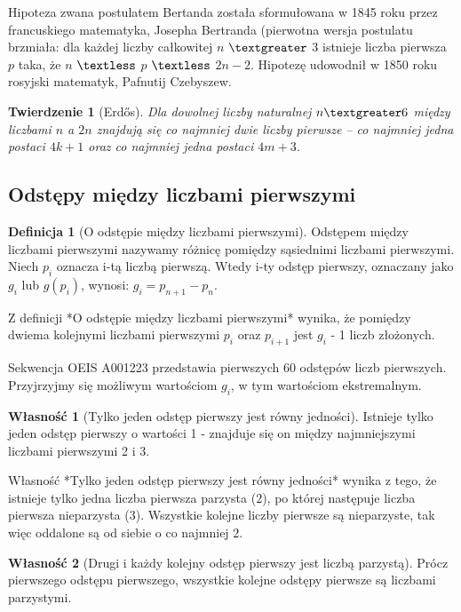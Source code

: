 \documentclass[10pt,onecolumn]{article}
\newtheorem{theorem}{Twierdzenie}
\theoremstyle{definition}
\newtheorem{definition}{Definicja}
\theoremstyle{hypothesis}
\theoremstyle{capability}
\newtheorem{capability}{Własność}
\begin{document}
Hipoteza zwana postulatem Bertanda została sformułowana w 1845 roku przez francuskiego matematyka, Josepha Bertranda (pierwotna wersja postulatu brzmiała:  dla każdej liczby całkowitej $n$ $\textgreater$ $3$ istnieje liczba pierwsza $p$ taka, że $n$ $\textless$ $p$ $\textless$ $2n-2$. Hipotezę udowodnił w 1850 roku rosyjski matematyk, Pafnutij Czebyszew.

\begin{theorem}[Erdős]
Dla dowolnej liczby naturalnej $n \textgreater 6$  między liczbami $n$ a $2n$ znajdują się co najmniej dwie liczby pierwsze – co najmniej jedna postaci $4k+1$ oraz co najmniej jedna postaci $4m+3$. 
\end{theorem}

\subsection{Odstępy między liczbami pierwszymi}

\begin{definition} [O odstępie między liczbami pierwszymi]
Odstępem między liczbami pierwszymi nazywamy różnicę pomiędzy sąsiednimi liczbami pierwszymi. Niech $p_i$ oznacza i-tą liczbą pierwszą. Wtedy i-ty odstęp pierwszy, oznaczany jako $g_i$ lub $g(p_i)$, wynosi: $g_i = p_{n+1} - p_n$.
\end{definition}

Z definicji *O odstępie między liczbami pierwszymi* wynika, że pomiędzy dwiema kolejnymi liczbami pierwszymi $p_i$ oraz $p_{i+1}$ jest $g_i$ - 1 liczb złożonych. \par

Sekwencja OEIS A001223 przedstawia pierwszych 60 odstępów liczb pierwszych. Przyjrzyjmy się możliwym wartościom $g_i$, w tym wartościom ekstremalnym.

\begin{capability}[Tylko jeden odstęp pierwszy jest równy jedności]
Istnieje tylko jeden odstęp pierwszy o wartości 1 - znajduje się on między najmniejszymi liczbami pierwszymi 2 i 3.
\end{capability}

Własność *Tylko jeden odstęp pierwszy jest równy jedności* wynika z tego, że istnieje tylko jedna liczba pierwsza parzysta ($2$), po której następuje liczba pierwsza nieparzysta ($3$). Wszystkie kolejne liczby pierwsze są nieparzyste, tak więc oddalone są od siebie o co najmniej $2$.

\begin{capability}[Drugi i każdy kolejny odstęp pierwszy jest liczbą parzystą]
Prócz pierwszego odstępu pierwszego, wszystkie kolejne odstępy pierwsze są liczbami parzystymi.
\end{capability}
\end{document}
